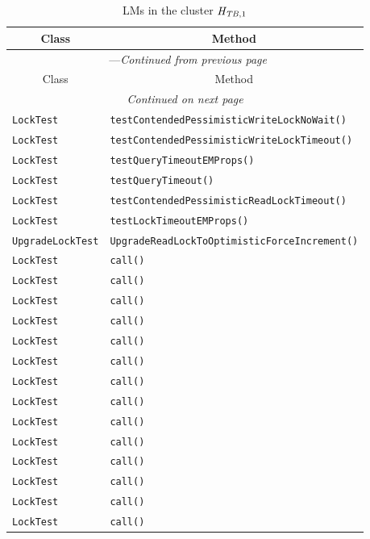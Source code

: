 \begin{center}
\begin{longtable}{ll}
\caption{LMs in the cluster $\mathit{H}_{\mathit{TB},1}$}\\
\toprule\multicolumn{1}{c}{Class}&\multicolumn{1}{c}{Method}\\\midrule
\endfirsthead

\multicolumn{2}{c}{\tablename\ \thetable{}---\textit{Continued from previous page}} \\\midrule
\multicolumn{1}{c}{Class}&\multicolumn{1}{c}{Method}\\\midrule
\endhead
\multicolumn{2}{c}{\textit{Continued on next page}}\\\midrule
\endfoot
\bottomrule
\endlastfoot

\lstinline/LockTest/&{\lstinline/testContendedPessimisticWriteLockNoWait()/}\\
\lstinline/LockTest/&{\lstinline/testContendedPessimisticWriteLockTimeout()/}\\
\lstinline/LockTest/&{\lstinline/testQueryTimeoutEMProps()/}\\
\lstinline/LockTest/&{\lstinline/testQueryTimeout()/}\\
\lstinline/LockTest/&{\lstinline/testContendedPessimisticReadLockTimeout()/}\\
\lstinline/LockTest/&{\lstinline/testLockTimeoutEMProps()/}\\
\lstinline/UpgradeLockTest/&{\lstinline/UpgradeReadLockToOptimisticForceIncrement()/}\\
\lstinline/LockTest/&{\lstinline/call()/}\\
\lstinline/LockTest/&{\lstinline/call()/}\\
\lstinline/LockTest/&{\lstinline/call()/}\\
\lstinline/LockTest/&{\lstinline/call()/}\\
\lstinline/LockTest/&{\lstinline/call()/}\\
\lstinline/LockTest/&{\lstinline/call()/}\\
\lstinline/LockTest/&{\lstinline/call()/}\\
\lstinline/LockTest/&{\lstinline/call()/}\\
\lstinline/LockTest/&{\lstinline/call()/}\\
\lstinline/LockTest/&{\lstinline/call()/}\\
\lstinline/LockTest/&{\lstinline/call()/}\\
\lstinline/LockTest/&{\lstinline/call()/}\\
\lstinline/LockTest/&{\lstinline/call()/}\\
\lstinline/LockTest/&{\lstinline/call()/}\\
\end{longtable}
\end{center}

